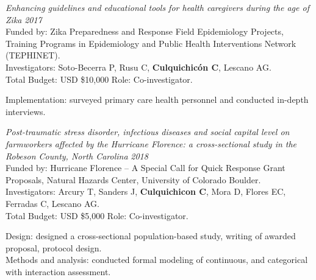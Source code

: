 \documentclass[10pt]{article}
\newenvironment{outerlist}[1][\enskip\textbullet]%
{\begin{itemize}[#1]}{\end{itemize}%
	\vspace{-0.6\baselineskip}}
\newenvironment{innerlist}[1][\enskip$\circ$]%
{\begin{compactitem}[#1]}{\end{compactitem}}
\begin{document}
\vspace{-0.10in}
\begin{outerlist}
	\item[] {\it Enhancing guidelines and educational tools for health caregivers during the age of Zika} \hfill {\it 2017} \\
	Funded by: Zika Preparedness and Response Field Epidemiology Projects, Training Programs in Epidemiology and Public Health Interventions Network (TEPHINET). \\
	Investigators: Soto-Becerra P, Rusu C, {\bf Culquichicón C}, Lescano AG. \\
	Total Budget: USD \$10,000  \hfill Role: Co-investigator.
	
	\begin{innerlist}
	\item[] 	Implementation: surveyed primary care health personnel and conducted in-depth interviews.
	\end{innerlist}
\end{outerlist}

\vspace{-0.10in}
\begin{outerlist}
	\item[] {\it Post-traumatic stress disorder, infectious diseases and social capital level on farmworkers affected by the Hurricane Florence: a cross-sectional study in the Robeson County, North Carolina} \hfill {\it 2018} \\
	Funded by: Hurricane Florence -- A Special Call for Quick Response Grant Proposals, Natural Hazards Center, University of Colorado Boulder. \\
	Investigators: Arcury T, Sanders J, {\bf Culquichicon C}, Mora D, Flores EC, Ferradas C, Lescano AG. \\
	Total Budget: USD \$5,000  \hfill Role: Co-investigator.
	
	\begin{innerlist}
	\item[] 	Design:  designed a cross-sectional population-based study, writing of awarded proposal, protocol design.\\
				Methods and analysis: conducted formal modeling of continuous, and categorical with interaction assessment.\\
	\end{innerlist}

\end{outerlist}

\vspace{-0.20in}
\end{document}
